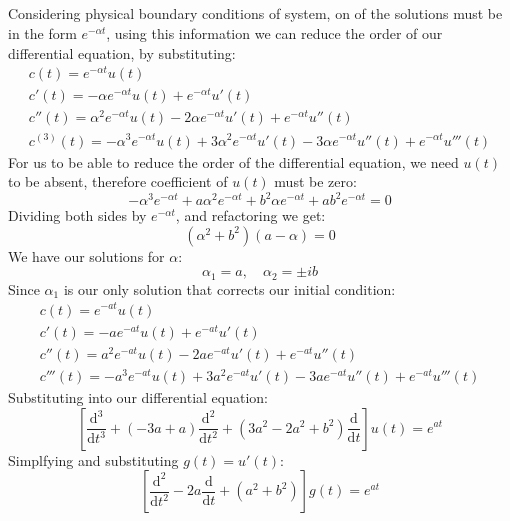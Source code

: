 \documentclass[12pt]{article}
\begin{document}
\subsection{}
Considering physical boundary conditions of system, on of the solutions must be in the form $e^{-\alpha t}$, using this information we can reduce the order of our differential equation, by substituting:
\begin{equation}
    \begin{gathered}
        c(t) = e^{-\alpha t}u(t)\\
        c'(t) = -\alpha e^{-\alpha t}u(t)+e^{-\alpha t}u'(t)\\
        c''(t) = \alpha^2 e^{-\alpha t}u(t)-2\alpha e^{-\alpha t}u'(t)+e^{-\alpha t}u''(t)\\
        c^{(3)}(t) = -\alpha^3 e^{-\alpha t}u(t)+3\alpha^2 e^{-\alpha t}u'(t)-3\alpha e^{-\alpha t}u''(t)+e^{-\alpha t}u'''(t)
    \end{gathered}
\end{equation}
For us to be able to reduce the order of the differential equation, we need $u(t)$ to be absent, therefore coefficient of $u(t)$ must be zero:
\begin{equation}
    -\alpha^3 e^{-\alpha t} + a\alpha^2 e^{-\alpha t} + b^2\alpha e^{-\alpha t} + ab^2e^{-\alpha t} = 0
\end{equation}
Dividing both sides by $e^{-\alpha t}$, and refactoring we get:
\begin{equation}
    \left(\alpha^2+b^2\right)\left(a-\alpha\right) = 0
\end{equation}
We have our solutions for $\alpha$:
\begin{equation}
    \alpha_1 = a, \quad \alpha_2 = \pm ib
\end{equation}
Since $\alpha_1$ is our only solution that corrects our initial condition:
\begin{equation}
    \begin{gathered}
        c(t) = e^{-at}u(t)\\
        c'(t) = -ae^{-at}u(t)+e^{-at}u'(t)\\
        c''(t) = a^2 e^{-at}u(t)-2ae^{-at}u'(t)+e^{-at}u''(t)\\
        c'''(t) = -a^3 e^{-at}u(t)+3a^2 e^{-at}u'(t)-3ae^{-at}u''(t)+e^{-at}u'''(t)
    \end{gathered}
\end{equation}
Substituting into our differential equation:
\begin{equation}
        \left[\frac{\mathrm{d^3}}{\mathrm{d}t^3}+(-3a+a)\frac{\mathrm{d}^2}{\mathrm{d}t^2}+(3a^2-2a^2+b^2) \frac{\mathrm{d}}{\mathrm{d}t}\right]u(t)= e^{at}
\end{equation}
Simplfying and substituting $g(t) = u'(t)$:
\begin{equation}
    \left[\frac{\mathrm{d}^2}{\mathrm{d}t^2}-2a \frac{\mathrm{d}}{\mathrm{d}t} + (a^2+b^2)\right]g(t) = e^{at}
\end{equation}
\end{document}
